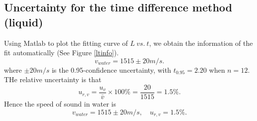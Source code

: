 \subsection{Uncertainty for the time difference method (liquid)}
    Using Matlab to plot the fitting curve of $L\ vs.\ t$, we obtain the  information of the fit automatically (See Figure \ref{ltinfo}). 
    \[
        v_{water}=1515\pm20 m/s.
    \]
    where $\pm 20m/s$ is the 0.95-confidence uncertainty, with $t_{0.95}=2.20$ when $n=12$. THe relative uncertainty is that
    \[
        u_{r,v}=\frac{u_v}{\bar{v}}\times100\%=\frac{20}{1515}=1.5\%.
    \]
    Hence the speed of sound in water is 
    \[
        v_{water}=1515\pm20m/s,\quad u_{r,v}=1.5\%.
    \]